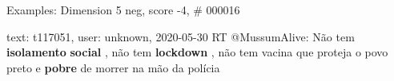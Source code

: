 \begin{frame}{Examples: Dimension 5 neg, score -4, \# 000016}
\footnotesize
\begin{alertblock}{text: t117051, user: unknown, 2020-05-30}
RT @MussumAlive: Não tem \textbf{isolamento} \textbf{social} , não tem 
\textbf{lockdown} , não tem vacina que proteja o povo preto e \textbf{pobre} de 
morrer na mão da polícia 
\end{alertblock}
\end{frame}
